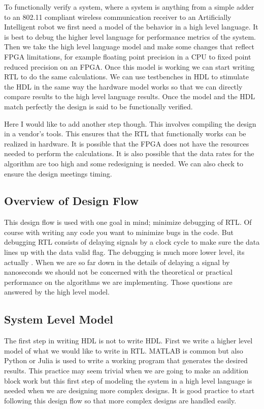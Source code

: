 To functionally verify a system, where a system is anything from a simple adder to an 802.11 compliant wireless communication receiver to an Artificially Intelligent robot we first need a model of the behavior in a high level language. It is best to debug the higher level language for performance metrics of the system. Then we take the high level language model and make some changes that reflect \ac{FPGA} limitations, for example floating point precision in a \ac{CPU} to fixed point reduced precision on an \ac{FPGA}. Once this model is working we can start writing \ac{RTL} to do the same calculations. We can use testbenches in \ac{HDL} to stimulate the \ac{HDL} in the same way the hardware model works so that we can directly compare results to the high level language results. Once the model and the \ac{HDL} match perfectly the design is said to be functionally verified.

Here I would like to add another step though. This involves compiling the design in a vendor's tools. This ensures that the \ac{RTL} that functionally works can be realized in hardware. It is possible that the \ac{FPGA} does not have the resources needed to perform the calculations. It is also possible that the data rates for the algorithm are too high and some redesigning is needed. We can also check to ensure the design meetings timing.

		

\subsection{Overview of Design Flow}

This design flow is used with one goal in mind; minimize debugging of \ac{RTL}. Of course with writing any code you want to minimize bugs in the code. But debugging \ac{RTL} consists of delaying signals by a clock cycle to make sure the data lines up with the data valid flag. The debugging is much more lower level, its actually . When we are so far down in the details of delaying a signal by nanoseconds we should not be concerned with the theoretical or practical performance on the algorithms we are implementing. Those questions are answered by the high level model.  
	
\subsection{System Level Model}

The first step in writing \ac{HDL} is not to write \ac{HDL}. First we write a higher level model of what we would like to write in \ac{RTL}. MATLAB is common but also Python or Julia is used to write a working program that generates the desired results. This practice may seem trivial when we are going to make an addition block work but this first step of modeling the system in a high level language is needed when we are designing more complex designs. It is good practice to start following this design flow so that more complex designs are handled easily.

